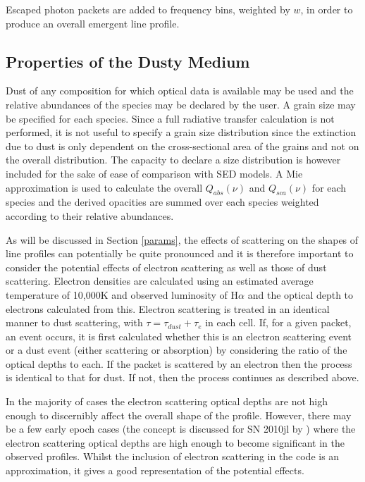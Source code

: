 \documentclass[useAMS,usenatbib,usegraphicx]{mnras}
\begin{document}
Escaped photon packets are added to frequency bins, weighted by $w$, in order to 
produce an overall emergent line profile.


\subsection{Properties of the Dusty Medium}

Dust of any composition for which optical data is available may be used
and the relative abundances of the species may be declared by the user.  
A grain size may be specified for each species.  Since a full radiative 
transfer calculation is not performed, it is not useful to specify a grain 
size distribution since the extinction due to dust is only dependent on the 
cross-sectional area of the grains and not on the overall distribution.  
The capacity to declare a size distribution is however included for the 
sake of ease of comparison with SED models.  A Mie approximation is used 
to calculate the overall $Q_{abs}(\nu)$ and $Q_{sca}(\nu)$ for each 
species and the derived opacities are summed over each species weighted 
according to their relative abundances.


As will be discussed in Section \ref{params}, the effects of scattering 
on the shapes of line profiles can potentially be quite pronounced and it 
is therefore important to consider the potential effects of electron 
scattering as well as those of dust scattering.  Electron densities are 
calculated using an estimated average temperature of 10,000K and observed luminosity 
of H${\alpha}$ and the optical depth to electrons calculated from this.  
Electron scattering is treated in an identical manner to dust scattering, 
with $\tau = \tau_{dust}+\tau_{e}$ in each cell.  If, for a given 
packet, an event occurs, it is first calculated whether this is an electron scattering event or a dust 
event (either scattering or absorption) by considering the ratio of the optical depths 
to each.  If the packet is scattered by an electron then the 
process is identical to that for dust.  If not, then the process continues as 
described above.

In the majority of cases the electron scattering optical depths are not high 
enough to discernibly affect the overall shape of the profile.  However, 
there may be a few early epoch cases (the concept is discussed for SN 2010jl 
by \citet{Fransson2013}) where the electron scattering optical depths are high enough to 
become significant in the observed profiles.  Whilst the inclusion of 
electron scattering in the code is an approximation, it gives a good 
representation of the potential effects.
\end{document}
